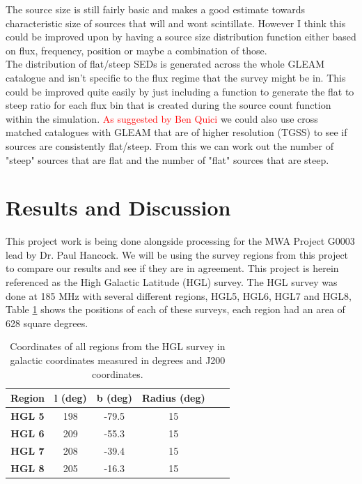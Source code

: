 \documentclass[a4paper]{article}
\begin{document}
The source size is still fairly basic and makes a good estimate towards characteristic size of sources that will and wont scintillate. However I think this could be improved upon by having a source size distribution function either based on flux, frequency, position or maybe a combination of those.\\

The distribution of flat/steep SEDs is generated across the whole GLEAM catalogue and isn't specific to the flux regime that the survey might be in. This could be improved quite easily by just including a function to generate the flat to steep ratio for each flux bin that is created during the source count function within the simulation. \textcolor{red}{As suggested by Ben Quici} we could also use cross matched catalogues with GLEAM that are of higher resolution (TGSS) to see if sources are consistently flat/steep. From this we can work out the number of "steep" sources that are flat and the number of "flat" sources that are steep.\\


\section{Results and Discussion}
 This project work is being done alongside processing for the MWA Project G0003 lead by Dr. Paul Hancock. We will be using the survey regions from this project to compare our results and see if they are in agreement. This project is herein referenced as the High Galactic Latitude (HGL) survey. The HGL survey  was done at 185 MHz with several different regions, HGL5, HGL6, HGL7 and HGL8, Table \ref{tab:regs} shows the positions of each of these surveys, each region had an area of 628 square degrees.\\


\begin{table}[H]
\centering
\begin{tabular}{cccccc}
\toprule
\textbf{Region} &\textbf{l (deg)}   & \textbf{b (deg)}    & \textbf{Radius (deg)}\\\midrule

\textbf{HGL 5}  & 198 & -79.5 & 15 \\
\textbf{HGL 6}  & 209 & -55.3 & 15 \\
\textbf{HGL 7}  & 208 & -39.4& 15 \\
\textbf{HGL 8}  & 205 & -16.3 & 15 \\\bottomrule
\end{tabular}
\caption{Coordinates of all regions from the HGL survey in galactic coordinates measured in degrees and J200 coordinates.}
\label{tab:regs}
\end{table}
\end{document}
